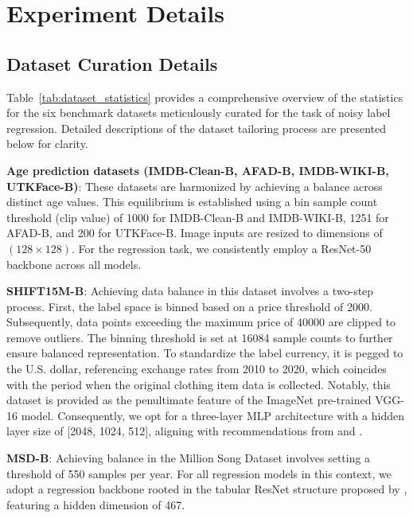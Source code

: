 \documentclass{article}
\def\yenrule{\rule{1.3ex}{.1ex}}
\def\textyen{\renewcommand\stacktype{L}\stackon[.4ex]{\stackon[.65ex]{Y}{\yenrule}}{\yenrule}}
\theoremstyle{plain}
\theoremstyle{definition}
\theoremstyle{remark}
\begin{document}
\section{Experiment Details}\label{sec:exp_details}

\subsection{Dataset Curation Details}\label{subsec:dataset_curation}
Table~\ref{tab:dataset_statistics} provides a comprehensive overview of the statistics for the six benchmark datasets meticulously curated for the task of noisy label regression. 
Detailed descriptions of the dataset tailoring process are presented below for clarity.

\textbf{Age prediction datasets (IMDB-Clean-B, AFAD-B, IMDB-WIKI-B, UTKFace-B)}: These datasets are harmonized by achieving a balance across distinct age values. 
This equilibrium is established using a bin sample count threshold (clip value) of 1000 for IMDB-Clean-B and IMDB-WIKI-B, 1251 for AFAD-B, and 200 for UTKFace-B. 
Image inputs are resized to dimensions of $(128\times128)$. 
For the regression task, we consistently employ a ResNet-50 backbone across all models.

\textbf{SHIFT15M-B}: Achieving data balance in this dataset involves a two-step process. 
First, the label space is binned based on a price threshold of \textyen2000. 
Subsequently, data points exceeding the maximum price of \textyen40000 are clipped to remove outliers. 
The binning threshold is set at 16084 sample counts to further ensure balanced representation. 
To standardize the label currency, it is pegged to the U.S. dollar, referencing exchange rates from 2010 to 2020, which coincides with the period when the original clothing item data is collected. 
Notably, this dataset is provided as the penultimate feature of the ImageNet pre-trained VGG-16 model. 
Consequently, we opt for a three-layer MLP architecture with a hidden layer size of [2048, 1024, 512], aligning with recommendations from \citet{papadopoulos22fashion} and \citet{kimura21shift15m}.

\textbf{MSD-B}: Achieving balance in the Million Song Dataset involves setting a threshold of 550 samples per year. 
For all regression models in this context, we adopt a regression backbone rooted in the tabular ResNet structure proposed by \citet{gorishniy21nips}, featuring a hidden dimension of 467.
\end{document}

